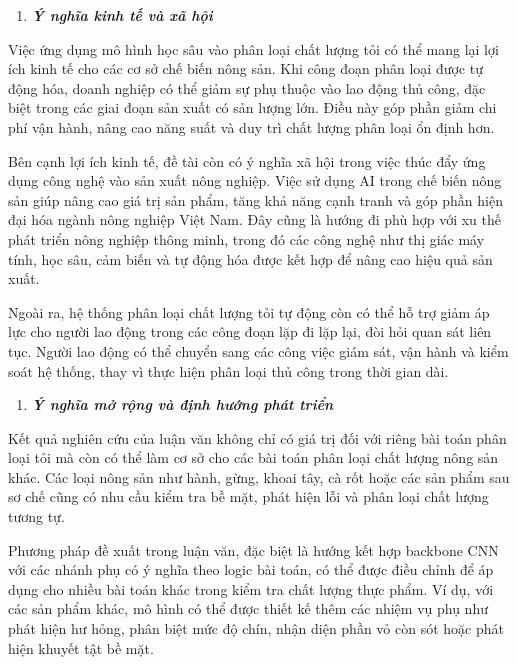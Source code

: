 \documentclass[
]{article}
\begin{document}
\begin{enumerate}
\def\labelenumi{\arabic{enumi}.}
\setcounter{enumi}{2}
\item
  \protect{}\label{_Toc232111991}{}\emph{\textbf{Ý nghĩa
  kinh tế và xã hội}}
\end{enumerate}

Việc ứng dụng mô hình học sâu vào phân loại chất lượng tỏi có thể mang
lại lợi ích kinh tế cho các cơ sở chế biến nông sản. Khi công đoạn phân
loại được tự động hóa, doanh nghiệp có thể giảm sự phụ thuộc vào lao
động thủ công, đặc biệt trong các giai đoạn sản xuất có sản lượng lớn.
Điều này góp phần giảm chi phí vận hành, nâng cao năng suất và duy trì
chất lượng phân loại ổn định hơn.

Bên cạnh lợi ích kinh tế, đề tài còn có ý nghĩa xã hội trong việc thúc
đẩy ứng dụng công nghệ vào sản xuất nông nghiệp. Việc sử dụng AI trong
chế biến nông sản giúp nâng cao giá trị sản phẩm, tăng khả năng cạnh
tranh và góp phần hiện đại hóa ngành nông nghiệp Việt Nam. Đây cũng là
hướng đi phù hợp với xu thế phát triển nông nghiệp thông minh, trong đó
các công nghệ như thị giác máy tính, học sâu, cảm biến và tự động hóa
được kết hợp để nâng cao hiệu quả sản xuất.

Ngoài ra, hệ thống phân loại chất lượng tỏi tự động còn có thể hỗ trợ
giảm áp lực cho người lao động trong các công đoạn lặp đi lặp lại, đòi
hỏi quan sát liên tục. Người lao động có thể chuyển sang các công việc
giám sát, vận hành và kiểm soát hệ thống, thay vì thực hiện phân loại
thủ công trong thời gian dài.

\begin{enumerate}
\def\labelenumi{\arabic{enumi}.}
\setcounter{enumi}{3}
\item
  \protect{}\label{_Toc232111992}{}\emph{\textbf{Ý nghĩa mở
  rộng và định hướng phát triển}}
\end{enumerate}

Kết quả nghiên cứu của luận văn không chỉ có giá trị đối với riêng bài
toán phân loại tỏi mà còn có thể làm cơ sở cho các bài toán phân loại
chất lượng nông sản khác. Các loại nông sản như hành, gừng, khoai tây,
cà rốt hoặc các sản phẩm sau sơ chế cũng có nhu cầu kiểm tra bề mặt,
phát hiện lỗi và phân loại chất lượng tương tự.

Phương pháp đề xuất trong luận văn, đặc biệt là hướng kết hợp backbone
CNN với các nhánh phụ có ý nghĩa theo logic bài toán, có thể được điều
chỉnh để áp dụng cho nhiều bài toán khác trong kiểm tra chất lượng thực
phẩm. Ví dụ, với các sản phẩm khác, mô hình có thể được thiết kế thêm
các nhiệm vụ phụ như phát hiện hư hỏng, phân biệt mức độ chín, nhận diện
phần vỏ còn sót hoặc phát hiện khuyết tật bề mặt.
\end{document}
